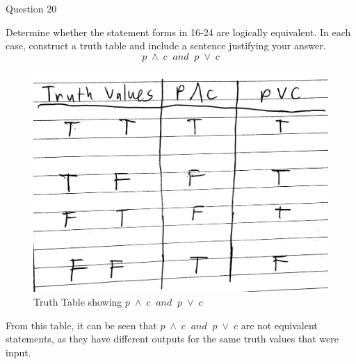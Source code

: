 \documentclass{article}
\begin{document}
\clearpage
{} Question 20
\item[]Determine whether the statement forms in 16-24 are logically equivalent. In each case, construct a truth table and include a sentence justifying your answer.
$$p \; \land \; c \;\; and \;\; p \; \lor \; c $$ 
\begin{figure}[h!]
  \includegraphics[width=\linewidth]{tt1.jpg}
  \caption{Truth Table showing $p \; \land \; c \;\; and \;\; p \; \lor \; c $}
  \label{fig:table1}
\end{figure}
\item[] From this table, it can be seen that $p \; \land \; c \;\; and \;\; p \; \lor \; c $ are not equivalent statements, as they have different outputs for the same truth values that were input.
\end{document}
